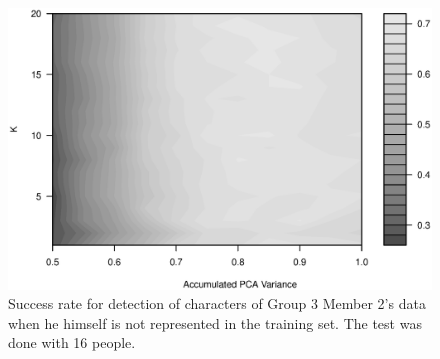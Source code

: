 \begin{figure}[h]
\centering
\includegraphics[width = \textwidth]{graphics/contour_k_PCA_oneVsRest}
\caption{Success rate for detection of characters of Group 3 Member 2's data when he himself is not represented in the training set. 
The test was done with 16 people.}
\label{fig:k_v_PCA}
\end{figure}


